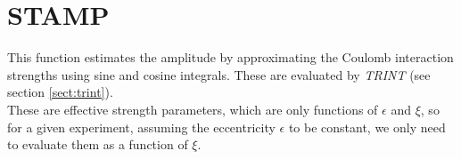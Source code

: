 \section{STAMP}
\label{sect:stamp}

\noindent This function estimates the amplitude by approximating the Coulomb
interaction strengths using sine and cosine integrals. These are evaluated by
{\em TRINT} (see section \ref{sect:trint}).\\

\noindent These are effective strength parameters, which are only functions
of $\epsilon$ and $\xi$, so for a given experiment, assuming the
eccentricity $\epsilon$ to be constant, we only need to evaluate them as a
function of $\xi$.\\
